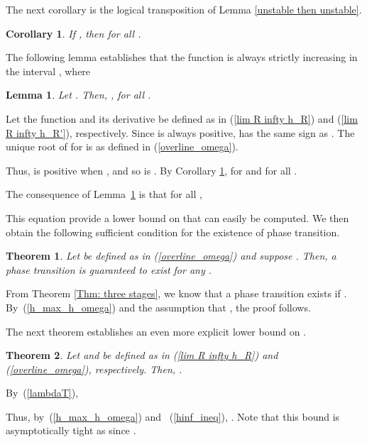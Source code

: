 \documentclass{IEEEtran}
\newtheorem{lemma}{Lemma}
\newtheorem{theorem}{Theorem}
\newtheorem{corollary}{Corollary}
\begin{document}
The next corollary is the logical transposition of Lemma \ref{unstable then unstable}.
\begin{corollary} \label{stability when R infty}
If , then  for all .
\end{corollary}

The following lemma establishes that the function  is always strictly increasing in the interval , where

\begin{lemma}
\label{stable fixed point}
Let . Then, , for all .
\end{lemma}
\begin{IEEEproof}
Let the function  and its derivative  be defined as in (\ref{lim R infty h_R}) and (\ref{lim R infty h_R'}),
respectively.
Since  is always positive,  has the same sign as .
The unique root of  for  is  as defined in (\ref{overline_omega}).

Thus,  is positive when ,
and so is . By Corollary \ref{stability when R infty},  for  and for all .

\end{IEEEproof}


The consequence of Lemma~\ref{stable fixed point} is that for all ,

This equation provide a lower bound on  that can easily be computed. We then obtain the following sufficient condition for the existence
of phase transition.

\begin{theorem}
\label{Thm:range of lambda T}
Let  be defined as in (\ref{overline_omega}) and suppose . Then, a phase transition is guaranteed to
exist for any .
\end{theorem}
\begin{IEEEproof}
From Theorem \ref{Thm: three stages}, we know that a phase transition exists if . By~(\ref{h_max_h_omega}) and the assumption
that , the proof follows.
\end{IEEEproof}





The next theorem establishes an even more explicit lower bound on .




\begin{theorem}
\label{Thm:specific range of lambda T}
Let  and  be defined as in (\ref{lim R infty h_R}) and (\ref{overline_omega}), respectively. Then,
.
\end{theorem}
\begin{IEEEproof}
By~(\ref{lambdaT}),

Thus, by~(\ref{h_max_h_omega}) and ~(\ref{hinf_ineq}), . Note that this bound is
asymptotically tight as  since .
\end{IEEEproof}
\end{document}
